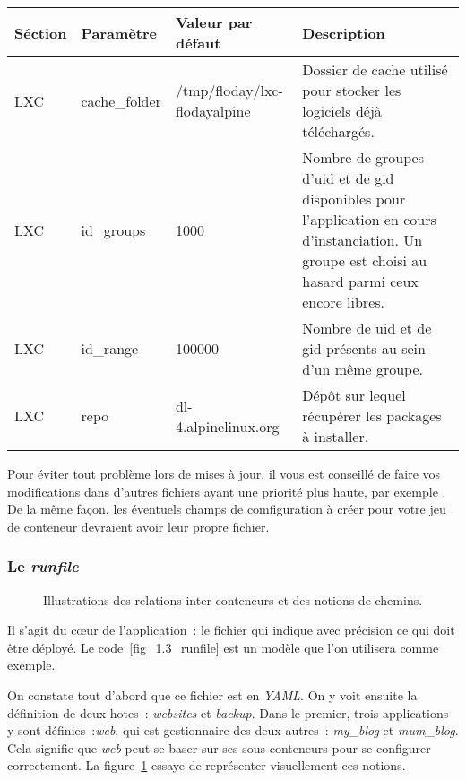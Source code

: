 \begin{tabular}{|l|l|p{4cm}|p{5.25cm}|}
	\hline
	Séction & Paramètre & Valeur par défaut & Description \\
	\hline
	LXC & cache\_folder & /tmp/floday/lxc-flodayalpine & Dossier de cache utilisé pour stocker les logiciels déjà téléchargés.\\
	LXC & id\_groups & 1000 & Nombre de groupes d'uid et de gid disponibles pour l'\gls{application} en cours d'\gls{instanciation}. Un groupe est choisi au hasard parmi ceux encore libres.\\
	LXC & id\_range & 100000 & Nombre de uid et de gid présents au sein d'un même groupe.\\
	LXC & repo & dl-4.alpinelinux.org & Dépôt sur lequel récupérer les packages à installer.\\
	\hline
\end{tabular}
\newline

Pour éviter tout problème lors de mises à jour, il vous est conseillé de faire vos modifications dans d'autres fichiers ayant une priorité plus haute, par exemple .
De la même façon, les éventuels champs de comfiguration à créer pour votre jeu de conteneur devraient avoir leur propre fichier.

\subsubsection{Le \emph{runfile}}

\begin{figure}
	\centerfloat
	\caption{Illustrations des relations inter-conteneurs et des notions de chemins.}
	\label{relation_conteneurs}
	
\end{figure}



Il s'agit du cœur de l'application~: le fichier qui indique avec précision ce qui doit être déployé.
Le code~\ref{fig_1.3_runfile} est un modèle que l'on utilisera comme exemple.

On constate tout d'abord que ce fichier est en \emph{YAML}. 
On y voit ensuite la définition de deux \glspl{hote}~: \emph{websites} et \emph{backup}.
Dans le premier, trois \glspl{application} y sont définies~:\emph{web}, qui est \gls{gestionnaire} des deux autres~: \emph{my\_blog} et \emph{mum\_blog}.
Cela signifie que \emph{web} peut se baser sur ses \glspl{sous-conteneur} pour se configurer correctement.
La figure~\ref{relation_conteneurs} essaye de représenter visuellement ces notions.

